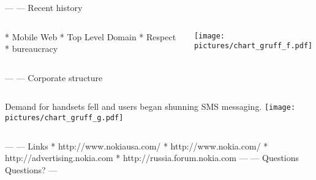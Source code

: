 \documentclass{beamer}
\begin{document}
---
--- Recent history
\begin{columns}
 * Mobile Web
 * Top Level Domain
 * Respect
 * bureaucracy

\texttt{[image: pictures/chart\_gruff\_f.pdf]}
\end{columns}
---
--- Corporate structure
\begin{columns}
Demand for handsets fell and users began shunning SMS messaging.
\texttt{[image: pictures/chart\_gruff\_g.pdf]}
\end{columns}
---
--- Links
 * http://www.nokiausa.com/
 * http://www.nokia.com/
 * http://advertising.nokia.com
 * http://russia.forum.nokia.com
---
--- Questions
\Huge{Questions?}
---
\end{document}
